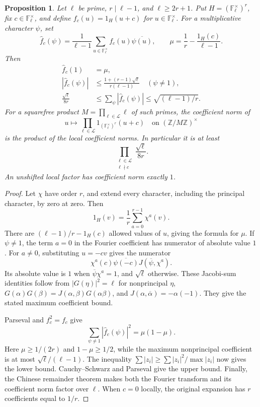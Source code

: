 \documentclass[11pt]{article}
\newtheorem{proposition}[theorem]{Proposition}
\theoremstyle{definition}
\theoremstyle{remark}
\begin{document}
\begin{proposition}\label{prop:shift-fourier-cost}
Let \(\ell\) be prime, \(r\mid\ell-1\), and \(\ell\geq2r+1\).
Put \(H=(\mathbb F_\ell^\times)^r\), fix \(c\in\mathbb F_\ell^\times\),
and define \(f_c(u)=1_H(u+c)\) for \(u\in\mathbb F_\ell^\times\).
For a multiplicative character \(\psi\), set
\[
 \widehat f_c(\psi)=
 \frac1{\ell-1}\sum_{u\in\mathbb F_\ell^\times}
 f_c(u)\overline{\psi(u)},\qquad
 \mu=\frac1r-\frac{1_H(c)}{\ell-1}.
\]
Then
\begin{align*}
 \widehat f_c(1)&=\mu,\\
 |\widehat f_c(\psi)|
 &\leq\frac{1+(r-1)\sqrt\ell}{r(\ell-1)}
 \quad(\psi\ne1),\\
 \frac{\sqrt\ell}{8r}
 &\leq \sum_\psi|\widehat f_c(\psi)|
 \leq \sqrt{(\ell-1)/r}.
\end{align*}
For a squarefree product \(M=\prod_{\ell\in\mathcal L}\ell\)
of such primes, the coefficient norm of
\[
 u\longmapsto
 \prod_{\ell\in\mathcal L}1_{(\mathbb F_\ell^\times)^r}(u+c)
 \quad\text{on }(\mathbb Z/M\mathbb Z)^\times
\]
is the product of the local coefficient norms. In particular it is
at least
\[
 \prod_{\substack{\ell\in\mathcal L\\\ell\nmid c}}
 \frac{\sqrt\ell}{8r}.
\]
An unshifted local factor has coefficient norm exactly \(1\).
\end{proposition}
\begin{proof}
Let \(\chi\) have order \(r\), and extend every character, including
the principal character, by zero at zero. Then
\[
 1_H(v)=\frac1r\sum_{a=0}^{r-1}\chi^a(v).
\]
There are \((\ell-1)/r-1_H(c)\) allowed values of \(u\), giving
the formula for \(\mu\). If \(\psi\ne1\), the term \(a=0\) in the
Fourier coefficient has numerator of absolute value \(1\).
For \(a\ne0\), substituting \(u=-cv\) gives the numerator
\[
 \chi^a(c)\overline{\psi(-c)}
 J(\overline\psi,\chi^a).
\]
Its absolute value is \(1\) when \(\overline\psi\chi^a=1\), and
\(\sqrt\ell\) otherwise. These Jacobi-sum identities follow from
\(|G(\eta)|^2=\ell\) for nonprincipal \(\eta\),
\(G(\alpha)G(\beta)=J(\alpha,\beta)G(\alpha\beta)\), and
\(J(\alpha,\overline\alpha)=-\alpha(-1)\).
They give the stated maximum coefficient bound.

Parseval and \(f_c^2=f_c\) give
\[
 \sum_{\psi\ne1}|\widehat f_c(\psi)|^2=\mu(1-\mu).
\]
Here \(\mu\geq1/(2r)\) and \(1-\mu\geq1/2\), while
the maximum nonprincipal coefficient is at most
\(\sqrt\ell/(\ell-1)\).
The inequality
\(\sum |z_i|\geq\sum|z_i|^2/\max|z_i|\) now gives the
lower bound. Cauchy--Schwarz and Parseval give the upper bound.
Finally, the Chinese remainder theorem makes both the Fourier
transform and its coefficient norm factor over \(\ell\).
When \(c=0\) locally, the original expansion has \(r\)
coefficients equal to \(1/r\).
\end{proof}
\end{document}

